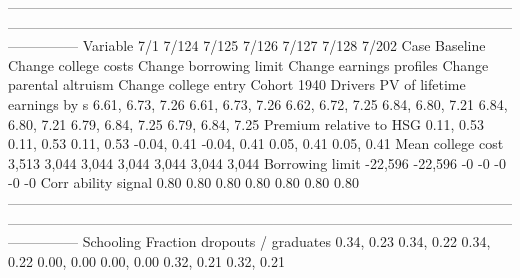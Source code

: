 ---------------------------------------------------------------------------------------------------------------------------------------------------------------------------------------------------------------------------------------
                              Variable                          7/1                        7/124                    7/125                     7/126                       7/127                       7/128                       7/202
                                  Case                     Baseline         Change college costs   Change borrowing limit  Change earnings profiles    Change parental altruism        Change college entry                 Cohort 1940
                               Drivers                                                                                                                                                                                                 
          PV of lifetime earnings by s             6.61, 6.73, 7.26             6.61, 6.73, 7.26         6.62, 6.72, 7.25          6.84, 6.80, 7.21            6.84, 6.80, 7.21            6.79, 6.84, 7.25            6.79, 6.84, 7.25
               Premium relative to HSG                   0.11, 0.53                   0.11, 0.53               0.11, 0.53               -0.04, 0.41                 -0.04, 0.41                  0.05, 0.41                  0.05, 0.41
                     Mean college cost                        3,513                        3,044                    3,044                     3,044                       3,044                       3,044                       3,044
                       Borrowing limit                      -22,596                      -22,596                       -0                        -0                          -0                          -0                          -0
                   Corr ability signal                         0.80                         0.80                     0.80                      0.80                        0.80                        0.80                        0.80
---------------------------------------------------------------------------------------------------------------------------------------------------------------------------------------------------------------------------------------
                             Schooling                                                                                                                                                                                                 
         Fraction dropouts / graduates                   0.34, 0.23                   0.34, 0.22               0.34, 0.22                0.00, 0.00                  0.00, 0.00                  0.32, 0.21                  0.32, 0.21
